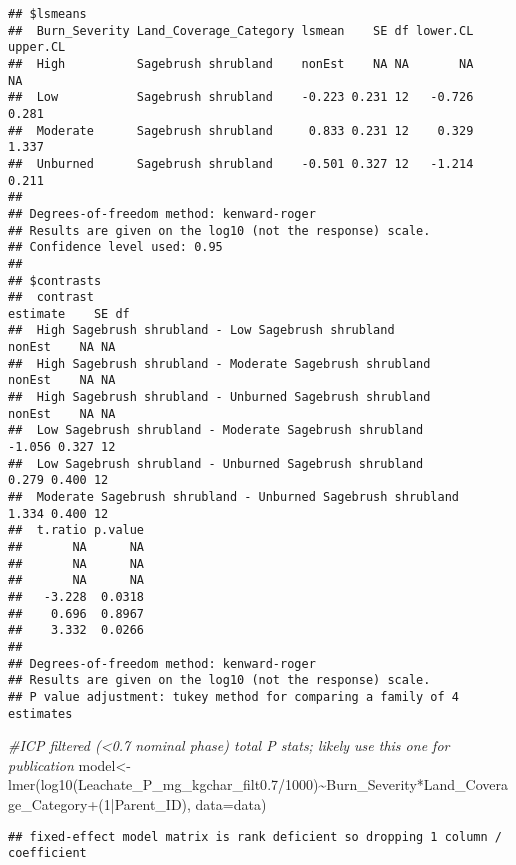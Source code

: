 \documentclass[
]{article}
\newenvironment{Shaded}{\begin{snugshade}}{\end{snugshade}}
\newcommand{\AttributeTok}[1]{\textcolor[rgb]{0.77,0.63,0.00}{#1}}
\newcommand{\CommentTok}[1]{\textcolor[rgb]{0.56,0.35,0.01}{\textit{#1}}}
\newcommand{\DecValTok}[1]{\textcolor[rgb]{0.00,0.00,0.81}{#1}}
\newcommand{\FloatTok}[1]{\textcolor[rgb]{0.00,0.00,0.81}{#1}}
\newcommand{\FunctionTok}[1]{\textcolor[rgb]{0.00,0.00,0.00}{#1}}
\newcommand{\NormalTok}[1]{#1}
\newcommand{\OtherTok}[1]{\textcolor[rgb]{0.56,0.35,0.01}{#1}}
\newcommand{\SpecialCharTok}[1]{\textcolor[rgb]{0.00,0.00,0.00}{#1}}
\begin{document}
\begin{verbatim}
## $lsmeans
##  Burn_Severity Land_Coverage_Category lsmean    SE df lower.CL upper.CL
##  High          Sagebrush shrubland    nonEst    NA NA       NA       NA
##  Low           Sagebrush shrubland    -0.223 0.231 12   -0.726    0.281
##  Moderate      Sagebrush shrubland     0.833 0.231 12    0.329    1.337
##  Unburned      Sagebrush shrubland    -0.501 0.327 12   -1.214    0.211
## 
## Degrees-of-freedom method: kenward-roger 
## Results are given on the log10 (not the response) scale. 
## Confidence level used: 0.95 
## 
## $contrasts
##  contrast                                                    estimate    SE df
##  High Sagebrush shrubland - Low Sagebrush shrubland            nonEst    NA NA
##  High Sagebrush shrubland - Moderate Sagebrush shrubland       nonEst    NA NA
##  High Sagebrush shrubland - Unburned Sagebrush shrubland       nonEst    NA NA
##  Low Sagebrush shrubland - Moderate Sagebrush shrubland        -1.056 0.327 12
##  Low Sagebrush shrubland - Unburned Sagebrush shrubland         0.279 0.400 12
##  Moderate Sagebrush shrubland - Unburned Sagebrush shrubland    1.334 0.400 12
##  t.ratio p.value
##       NA      NA
##       NA      NA
##       NA      NA
##   -3.228  0.0318
##    0.696  0.8967
##    3.332  0.0266
## 
## Degrees-of-freedom method: kenward-roger 
## Results are given on the log10 (not the response) scale. 
## P value adjustment: tukey method for comparing a family of 4 estimates
\end{verbatim}

\begin{Shaded}
\begin{Highlighting}[]
\CommentTok{\#ICP filtered (\textless{}0.7 nominal phase) total P stats; likely use this one for publication}
\NormalTok{model}\OtherTok{\textless{}{-}}\FunctionTok{lmer}\NormalTok{(}\FunctionTok{log10}\NormalTok{(Leachate\_P\_mg\_kgchar\_filt0}\FloatTok{.7}\SpecialCharTok{/}\DecValTok{1000}\NormalTok{)}\SpecialCharTok{\textasciitilde{}}\NormalTok{Burn\_Severity}\SpecialCharTok{*}\NormalTok{Land\_Coverage\_Category}\SpecialCharTok{+}\NormalTok{(}\DecValTok{1}\SpecialCharTok{|}\NormalTok{Parent\_ID), }\AttributeTok{data=}\NormalTok{data)}
\end{Highlighting}
\end{Shaded}

\begin{verbatim}
## fixed-effect model matrix is rank deficient so dropping 1 column / coefficient
\end{verbatim}
\end{document}

